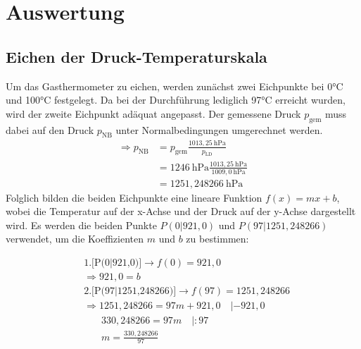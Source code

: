 \documentclass[a4paper,12pt]{article}
\begin{document}
\section{Auswertung}
\subsection{Eichen der Druck-Temperaturskala}
Um das Gasthermometer zu eichen, werden zunächst zwei Eichpunkte bei 0\si{\celsius} und 100\si{\celsius} festgelegt. Da bei der Durchführung lediglich 97\si{\celsius} erreicht wurden, wird der zweite Eichpunkt adäquat angepasst. Der gemessene Druck \(p_\text{gem}\) muss dabei auf den Druck \(p_\text{NB}\) unter Normalbedingungen umgerechnet werden. 
\begin{equation}
\begin{aligned}
\Rightarrow p_\text{NB} &= p_\text{gem} \frac{1013{,}25~\text{hPa}}{p_\text{LD}} \\
&= 1246~\text{hPa} \frac{1013{,}25~\text{hPa}}{1009,0~\text{hPa}} \\
&= 1251,248266~\text{hPa}
\end{aligned}
\end{equation}
Folglich bilden die beiden Eichpunkte eine lineare Funktion \(f(x) = mx + b\), wobei die Temperatur auf der x-Achse und der Druck auf der y-Achse dargestellt wird. Es werden die beiden Punkte \(P(0|921,0)\) und \(P(97|1251,248266)\) verwendet, um die Koeffizienten \(m\) und \(b\) zu bestimmen:

\begin{equation}
  \begin{aligned}
    & \text{1.[P(0|921,0)]} \rightarrow f(0) = 921{,}0 \\
    & \Rightarrow 921{,}0 = b \\
    & \text{2.[P(97|1251,248266)]} \rightarrow f(97) = 1251,248266 \\
    & \Rightarrow 1251,248266 = 97m + 921,0 \quad | - 921,0 \\
    & \phantom{~\Rightarrow} 330,248266 = 97m \quad | : 97 \\
    & \phantom{~\Rightarrow} m = \frac{330,248266}{97}
  \end{aligned}
\end{equation}
\end{document}
